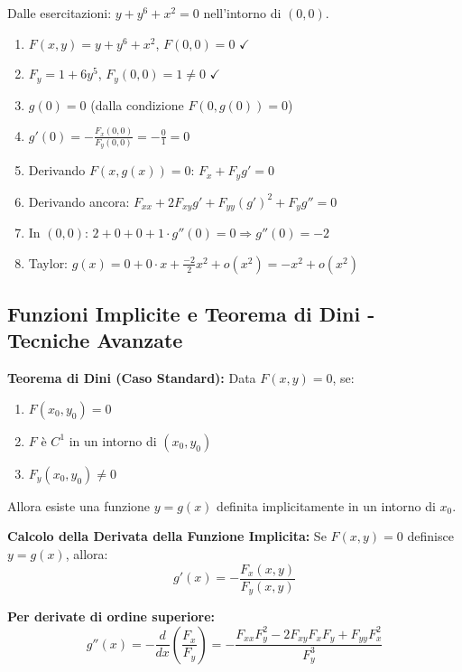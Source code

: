 \begin{esempio}
Dalle esercitazioni: $y + y^6 + x^2 = 0$ nell'intorno di $(0,0)$.

\begin{enumerate}
    \item \(F(x,y) = y + y^6 + x^2\), \(F(0,0) = 0\) \(\checkmark\)
    \item \(F_y = 1 + 6y^5\), \(F_y(0,0) = 1 \neq 0\) \(\checkmark\)
    \item $g(0) = 0$ (dalla condizione $F(0,g(0)) = 0$)
    \item $g'(0) = -\frac{F_x(0,0)}{F_y(0,0)} = -\frac{0}{1} = 0$
    \item Derivando $F(x,g(x)) = 0$: $F_x + F_y g' = 0$
    \item Derivando ancora: $F_{xx} + 2F_{xy}g' + F_{yy}(g')^2 + F_y g'' = 0$
    \item In $(0,0)$: $2 + 0 + 0 + 1 \cdot g''(0) = 0 \Rightarrow g''(0) = -2$
    \item Taylor: $g(x) = 0 + 0 \cdot x + \frac{-2}{2}x^2 + o(x^2) = -x^2 + o(x^2)$
\end{enumerate}
\end{esempio}

\subsection{Funzioni Implicite e Teorema di Dini - Tecniche Avanzate}

\begin{info}
\textbf{Teorema di Dini (Caso Standard):}
Data \(F(x,y) = 0\), se:
\begin{enumerate}
    \item \(F(x_0,y_0) = 0\)
    \item \(F\) è \(C^1\) in un intorno di \((x_0,y_0)\)
    \item \(F_y(x_0,y_0) \neq 0\)
\end{enumerate}
Allora esiste una funzione \(y = g(x)\) definita implicitamente in un intorno di \(x_0\).
\end{info}

\begin{strategia}
\textbf{Calcolo della Derivata della Funzione Implicita:}
Se \(F(x,y) = 0\) definisce \(y = g(x)\), allora:
\[ g'(x) = -\frac{F_x(x,y)}{F_y(x,y)} \]

\textbf{Per derivate di ordine superiore:}
\[ g''(x) = -\frac{d}{dx}\left(\frac{F_x}{F_y}\right) = -\frac{F_{xx}F_y^2 - 2F_{xy}F_xF_y + F_{yy}F_x^2}{F_y^3} \]
\end{strategia}

